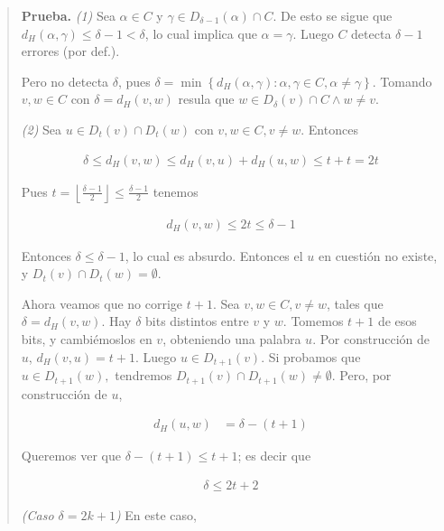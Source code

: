 \documentclass[a4paper]{article}
\begin{document}
\small
\begin{quote}

    \textbf{Prueba.} \textit{(1)} Sea $\alpha \in C$ y $\gamma \in D_{\delta-1}(\alpha) \cap  C$. De esto 
    se sigue que $d_H(\alpha, \gamma) \leq \delta - 1 < \delta$, lo cual 
    implica que $\alpha = \gamma$. Luego $C$ detecta 
    $\delta - 1$ errores (por def.).

    Pero no detecta $\delta$, pues $\delta = \min \left\{ d_H(\alpha,\gamma) :
    \alpha, \gamma \in C, \alpha \neq \gamma \right\} $. Tomando $v, w \in C$
    con $\delta = d_H(v, w)$ resula que $w \in D_{\delta}(v) \cap C \land  w
    \neq v$.

    \textit{(2)} Sea $u \in D_t(v) \cap D_t(w)$ con $v, w \in C, v \neq w$. Entonces 

    \begin{align*}
        \delta \leq d_H(v, w) \leq d_H(v, u) + d_H(u, w) \leq t + t = 2t
    \end{align*} 

    Pues $t = \left\lfloor \frac{\delta-1}{2} \right\rfloor \leq \frac{\delta - 1}{2}$ tenemos 

    \begin{align*}
        d_H(v, w) \leq 2t \leq \delta - 1
    \end{align*}

    Entonces $\delta \leq \delta - 1$, lo cual es absurdo. Entonces el $u$ en cuestión no existe, 
    y $D_t(v) \cap D_t(w) = \emptyset$. 

    Ahora veamos que no corrige $t + 1$. Sea $v, w \in C, v \neq w$, tales que
    $\delta = d_H(v, w)$. Hay $\delta$ bits distintos entre $v$ y $w$. Tomemos
    $t + 1$ de esos bits, y cambiémoslos en $v$, obteniendo una palabra $u$.
    Por construcción de $u$, $d_H(v, u) = t + 1$. Luego $u \in D_{t+1}(v)$. Si
    probamos que $u \in D_{t+1}(w),$ tendremos $D_{t+1}(v) \cap D_{t+1}(w) \neq
    \emptyset$. Pero, por construcción de $u$,

    \begin{align*}
        d_H(u, w) &= \delta - (t+1)
    \end{align*}

    Queremos ver que $\delta - (t + 1) \leq t+ 1$; es decir que

        \begin{align*}
            \delta \leq 2t + 2
        \end{align*}

    \textit{(Caso $\delta = 2k + 1$)} En este caso, 


\end{quote}
\end{document}
